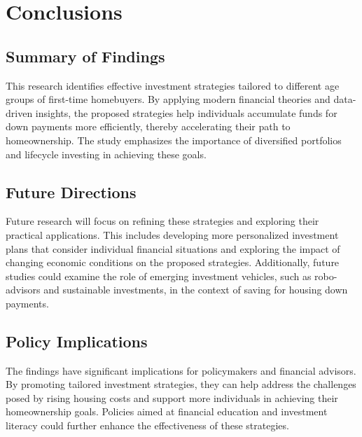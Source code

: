 \section{Conclusions}

\subsection{Summary of Findings}
This research identifies effective investment strategies tailored to different age groups of first-time homebuyers. By applying modern financial theories and data-driven insights, the proposed strategies help individuals accumulate funds for down payments more efficiently, thereby accelerating their path to homeownership. The study emphasizes the importance of diversified portfolios and lifecycle investing in achieving these goals.

\subsection{Future Directions}
Future research will focus on refining these strategies and exploring their practical applications. This includes developing more personalized investment plans that consider individual financial situations and exploring the impact of changing economic conditions on the proposed strategies. Additionally, future studies could examine the role of emerging investment vehicles, such as robo-advisors and sustainable investments, in the context of saving for housing down payments.

\subsection{Policy Implications}
The findings have significant implications for policymakers and financial advisors. By promoting tailored investment strategies, they can help address the challenges posed by rising housing costs and support more individuals in achieving their homeownership goals. Policies aimed at financial education and investment literacy could further enhance the effectiveness of these strategies.
